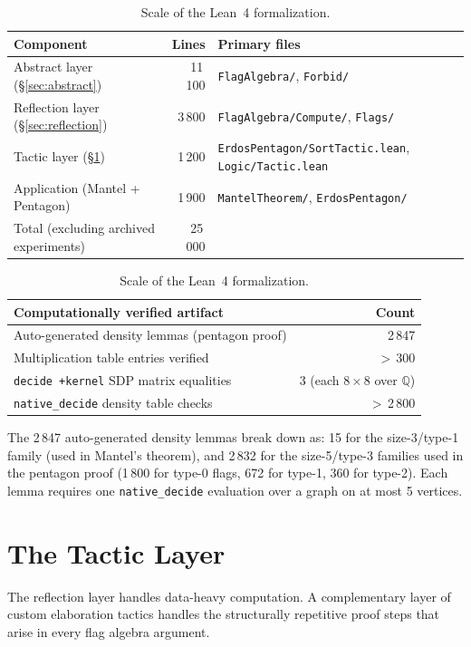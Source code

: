 \documentclass{article}
\newcommand{\lean}[1]{\texttt{#1}}
\begin{document}
\begin{table}
  \caption{Scale of the Lean~4 formalization.}
  \label{tab:metrics}
  \begin{tabular}{lrl}
    \toprule
    Component & Lines & Primary files \\
    \midrule
    Abstract layer (\S\ref{sec:abstract}) & 11\,100 &
      \lean{FlagAlgebra/}, \lean{Forbid/} \\
    Reflection layer (\S\ref{sec:reflection}) & 3\,800 &
      \lean{FlagAlgebra/Compute/}, \lean{Flags/} \\
    Tactic layer (\S\ref{sec:tactics}) & 1\,200 &
      \lean{ErdosPentagon/SortTactic.lean}, \lean{Logic/Tactic.lean} \\
    Application (Mantel + Pentagon) & 1\,900 &
      \lean{MantelTheorem/}, \lean{ErdosPentagon/} \\
    \midrule
    Total (excluding archived experiments) & 25\,000 & \\
    \bottomrule
  \end{tabular}

  \medskip
  \begin{tabular}{lr}
    \toprule
    Computationally verified artifact & Count \\
    \midrule
    Auto-generated density lemmas (pentagon proof) & 2\,847 \\
    Multiplication table entries verified & $>$\,300 \\
    \lean{decide~+kernel} SDP matrix equalities & 3 (each $8{\times}8$ over $\mathbb{Q}$) \\
    \lean{native\_decide} density table checks & $>$\,2\,800 \\
    \bottomrule
  \end{tabular}
\end{table}

The 2\,847 auto-generated density lemmas break down as: 15 for the
size-3/type-1 family (used in Mantel's theorem), and 2\,832 for the
size-5/type-3 families used in the pentagon proof (1\,800 for type-0 flags,
672 for type-1, 360 for type-2).  Each lemma requires one \lean{native\_decide}
evaluation over a graph on at most 5 vertices.


\section{The Tactic Layer}
\label{sec:tactics}

The reflection layer handles data-heavy computation.  A complementary layer of
custom elaboration tactics handles the structurally repetitive proof steps that
arise in every flag algebra argument.
\end{document}
